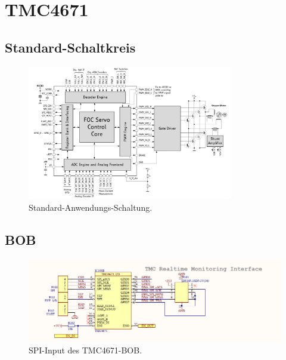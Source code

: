 \section{TMC4671}\label{Appendix:TMC4671}

\subsection{Standard-Schaltkreis}\label{Appendix:Schaltung_TMC4671}

\begin{figure}[H]
	\centering
	\includegraphics[width=0.8\textwidth]{graphics/Standard_Application_Cirquit_TMC4671}
	\caption{Standard-Anwendungs-Schaltung.}
	\label{fig:Schaltung_TMC4671}
\end{figure}

\subsection{BOB}\label{Appendix:BOB}

\begin{figure}[H]
	\centering
	\includegraphics[width=\textwidth]{graphics/TMC4671_SPI_BOB_Schematic}
	\caption{SPI-Input des TMC4671-BOB. \cite{trinamicmotion_control_gmbh__co_kg_tmc4671-bob_2020}}
	\label{fig:Schema_SPI_FOC_Treiber}
\end{figure} 

